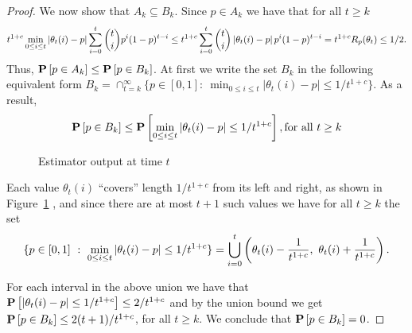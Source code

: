 \begin{proof}
  We now show that $A_k \subseteq B_k$.
  Since $p \in A_k$ we have that for all $t\geq k$
  \[
    t^{1 + c} \min_{0 \leq i \leq t} \left| \theta_t(i) - p \right|
    \sum_{i=0}^t \binom{t}{i} p^i (1-p)^{t-i}
    \leq
    t^{1 + c} \sum_{i=0}^t \binom{t}{i} \left| \theta_t(i) - p \right| p^i (1-p)^{t-i}
    = t^{1+c} R_p(\theta_t)
    \leq
    1/2.
  \]
  Thus, $\bm{\mathrm{P}}\left[p \in A_k\right] \leq \bm{\mathrm{P}}\left[p \in B_k\right]$.
  At first we write the set $B_k$ in the following equivalent form
  $
  B_k = \cap_{t=k}^{\infty}\{p \in [0,1]:~ \min_{0 \leq
    i \leq t} |\theta_t(i)-p|\leq 1/t^{1+c}
  \}$.
  As a result,
  \[
    \bm{\mathrm{P}}\left[p \in B_k\right]
    \leq \bm{\mathrm{P}}\left[\min_{0 \leq i \leq t}|\theta_t(i)-p| \leq 1/t^{1+c} \right],
    \text{for all } t \geq k
  \]
  \begin{figure}
  \centering
  \caption{Estimator output at time $t$} \label{fig:estimator}
\end{figure}
  Each value $\theta_t(i)$ \enquote{covers} length $1/t^{1+c}$ from
  its left and right, as shown in Figure~\ref{fig:estimator}
  , and since there are at most $t+1$ such values
  we have for all $t \geq k$ the set
  \[
    \{
    p \in [0,1]\ :\ {\min_{0 \leq i \leq t} |\theta_t(i)-p| \leq 1/t^{1+c} }
    \}
    =
    \bigcup_{i=0}^t
    \left(
    \theta_t(i) - \frac{1}{t^{1+c}},\ \theta_t(i) + \frac{1}{t^{1+c}}
    \right).
  \]

  For each interval in the above union we have that
  $\bm{\mathrm{P}}\left[|\theta_t(i)-p| \leq 1/t^{1+c}\right]\leq 2/t^{1+c}$
  and by the union bound we get
  $\bm{\mathrm{P}}\left[p \in B_k\right] \leq 2(t+1)/t^{1+c}$, for all $t \geq k$.
  We conclude that $\bm{\mathrm{P}}\left[p \in B_k\right] =0$.
\end{proof}
